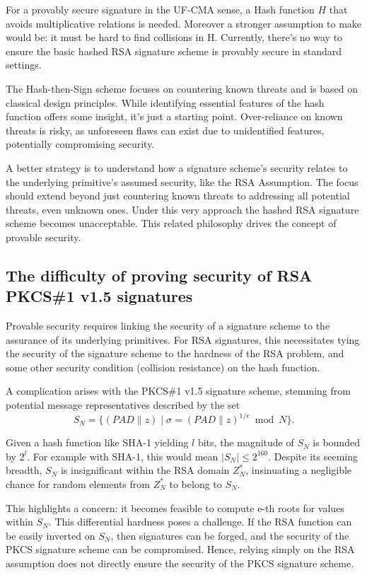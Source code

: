 \documentclass[]{final_report}
\theoremstyle{definition}
\begin{document}
For a provably secure signature in the UF-CMA sense, a Hash function \(H\) that avoids multiplicative relations is needed. Moreover a stronger assumption to make would be: it must be hard to find collisions in H. Currently, there's no way to ensure the basic hashed RSA signature scheme is provably secure in standard settings.

The Hash-then-Sign scheme focuses on countering known threats and is based on classical design principles. While identifying essential features of the hash function offers some insight, it's just a starting point. Over-reliance on known threats is risky, as unforeseen flaws can exist due to unidentified features, potentially compromising security.

A better strategy is to understand how a signature scheme's security relates to the underlying primitive's assumed security, like the RSA Assumption. The focus should extend beyond just countering known threats to addressing all potential threats, even unknown ones. Under this very approach the hashed RSA signature scheme becomes unacceptable. This related philosophy drives the concept of provable security.


\subsection{The difficulty of proving security of RSA PKCS\#1 v1.5 signatures}

Provable security requires linking the security of a signature scheme to the assurance of its underlying primitives. For RSA signatures, this necessitates tying the security of the signature scheme to the hardness of the RSA problem, and some other security condition (collision resistance) on the hash function.

A complication arises with the PKCS\#1 v1.5 signature scheme, stemming from potential message representatives described by the set
\[ S_N = \{ (PAD \| z) \mid \sigma = (PAD \| z)^{1/e} \bmod N \}. \]

Given a hash function like SHA-1 yielding $l$ bits, the magnitude of $S_N$ is bounded by $2^l$. For example with SHA-1, this would mean  $|S_N| \leq 2^{160}$. Despite its seeming breadth, $S_N$ is insignificant within the RSA domain \( Z_N^* \), insinuating a negligible chance for random elements from \( Z_N^* \) to belong to \( S_N \).

This highlights a concern: it becomes feasible to compute e-th roots for values within $S_N$. This differential hardness poses a challenge. If the RSA function can be easily inverted on  $S_N$, then signatures can be forged, and the security of the PKCS signature scheme can be compromised. Hence, relying simply on the RSA assumption does not directly ensure the security of the PKCS signature scheme. 
\end{document}
